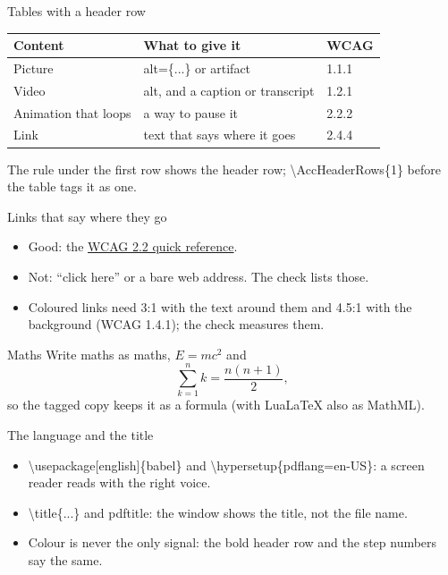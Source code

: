 \documentclass[aspectratio=169]{beamer}
\newcommand{\code}[1]{{\small\ttfamily #1}}
\begin{document}
\begin{frame}{Tables with a header row}
  \centering
  \begin{tabular}{@{}lll@{}}
    \toprule
    \textbf{Content} & \textbf{What to give it} & \textbf{WCAG} \\
    \midrule
    Picture & \code{alt=\{...\}} or \code{artifact} & 1.1.1 \\
    Video & \code{alt}, and a caption or transcript & 1.2.1 \\
    Animation that loops & a way to pause it & 2.2.2 \\
    Link & text that says where it goes & 2.4.4 \\
    \bottomrule
  \end{tabular}
  \par\medskip
  \small The rule under the first row shows the header row; \code{\textbackslash AccHeaderRows\{1\}} before the table tags it as one.
\end{frame}

\begin{frame}{Links that say where they go}
  \begin{itemize}
    \item Good: the \href{https://www.w3.org/WAI/WCAG22/quickref/}{WCAG 2.2 quick reference}.
    \item Not: ``click here'' or a bare web address. The check lists those.
    \item Coloured links need 3:1 with the text around them and 4.5:1 with the background (WCAG 1.4.1); the check measures them.
  \end{itemize}
  \par\medskip
  \begin{block}{Maths}
    Write maths as maths, $E = mc^2$ and
    \[ \sum_{k=1}^{n} k = \frac{n(n+1)}{2}, \]
    so the tagged copy keeps it as a formula (with LuaLaTeX also as MathML).
  \end{block}
\end{frame}

\begin{frame}{The language and the title}
  \begin{itemize}
    \item \code{\textbackslash usepackage[english]\{babel\}} and \code{\textbackslash hypersetup\{pdflang=en-US\}}: a screen reader reads with the right voice.
    \item \code{\textbackslash title\{...\}} and \code{pdftitle}: the window shows the title, not the file name.
    \item Colour is never the only signal: the bold header row and the step numbers say the same.
  \end{itemize}
\end{frame}
\end{document}
